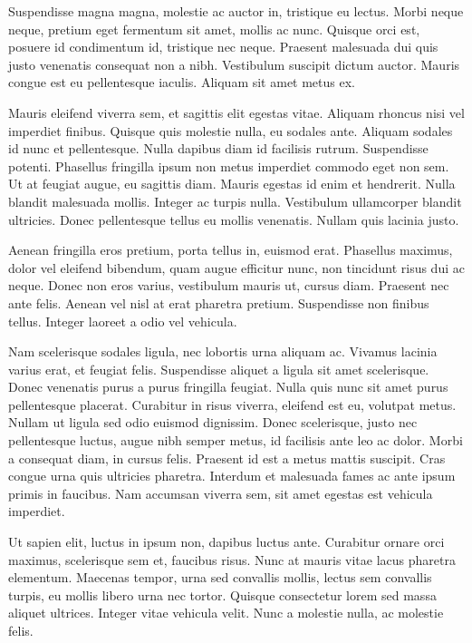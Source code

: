\documentclass[book,A4paper,10pt,twoside,oldfontcommands]{memoir}\usepackage[]{graphicx}\usepackage[usenames,dvipsnames]{color}
\begin{document}
Suspendisse magna magna, molestie ac auctor in, tristique eu lectus.
Morbi neque neque, pretium eget fermentum sit amet, mollis ac nunc.
Quisque orci est, posuere id condimentum id, tristique nec neque.
Praesent malesuada dui quis justo venenatis consequat non a nibh.
Vestibulum suscipit dictum auctor. Mauris congue est eu pellentesque
iaculis. Aliquam sit amet metus ex. 

Mauris eleifend viverra sem, et sagittis elit egestas vitae. Aliquam
rhoncus nisi vel imperdiet finibus. Quisque quis molestie nulla, eu
sodales ante. Aliquam sodales id nunc et pellentesque. Nulla dapibus
diam id facilisis rutrum. Suspendisse potenti. Phasellus fringilla
ipsum non metus imperdiet commodo eget non sem. Ut at feugiat augue,
eu sagittis diam. Mauris egestas id enim et hendrerit. Nulla blandit
malesuada mollis. Integer ac turpis nulla. Vestibulum ullamcorper
blandit ultricies. Donec pellentesque tellus eu mollis venenatis.
Nullam quis lacinia justo. 

Aenean fringilla eros pretium, porta tellus in, euismod erat.
Phasellus maximus, dolor vel eleifend bibendum, quam augue efficitur
nunc, non tincidunt risus dui ac neque. Donec non eros varius,
vestibulum mauris ut, cursus diam. Praesent nec ante felis. Aenean vel
nisl at erat pharetra pretium. Suspendisse non finibus tellus. Integer
laoreet a odio vel vehicula. 

Nam scelerisque sodales ligula, nec lobortis urna aliquam ac. Vivamus
lacinia varius erat, et feugiat felis. Suspendisse aliquet a ligula
sit amet scelerisque. Donec venenatis purus a purus fringilla feugiat.
Nulla quis nunc sit amet purus pellentesque placerat. Curabitur in
risus viverra, eleifend est eu, volutpat metus. Nullam ut ligula sed
odio euismod dignissim. Donec scelerisque, justo nec pellentesque
luctus, augue nibh semper metus, id facilisis ante leo ac dolor. Morbi
a consequat diam, in cursus felis. Praesent id est a metus mattis
suscipit. Cras congue urna quis ultricies pharetra. Interdum et
malesuada fames ac ante ipsum primis in faucibus. Nam accumsan viverra
sem, sit amet egestas est vehicula imperdiet.
 
Ut sapien elit, luctus in ipsum non, dapibus luctus ante. Curabitur
ornare orci maximus, scelerisque sem et, faucibus risus. Nunc at
mauris vitae lacus pharetra elementum. Maecenas tempor, urna sed
convallis mollis, lectus sem convallis turpis, eu mollis libero urna
nec tortor. Quisque consectetur lorem sed massa aliquet ultrices.
Integer vitae vehicula velit. Nunc a molestie nulla, ac molestie
felis.
\end{document}
